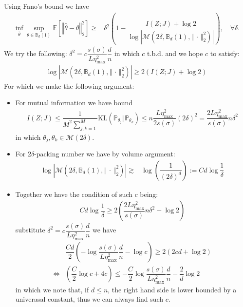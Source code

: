 \documentclass[11pt,a4paper]{ctexart}
\numberwithin{equation}{section}%
\begin{document}
Using Fano's bound we have
\begin{align*}
    \mathop{ \inf }\limits_{\hat{\theta }}\mathop{ \sup }\limits_{\theta \in \mathbb{B}_d(1)} \mathbb{E}\left[ \left\Vert \hat{\theta }-\theta  \right\Vert _2^2 \right] \geq & \delta ^2\left(1-\dfrac{ I(Z;J)+\log 2 }{ \log \left\vert \mathcal{M}(2\delta ,\mathbb{B}_d(1), \left\Vert \, \cdot \,  \right\Vert _2^2 ) \right\vert  }  \right),\quad \forall \delta .
\end{align*}
We try the following: $ \delta ^2 = c\dfrac{ s(\sigma ) }{ L\eta_{\max}^2 }\dfrac{ d }{ n }   $ in which $ c $ t.b.d. and we hope $ c $ to satisfy:
\begin{align*}
    \log \left\vert \mathcal{M}(2\delta ,\mathbb{B}_d(1), \left\Vert \, \cdot \,  \right\Vert _2^2 ) \right\vert \geq 2( I(Z;J)+\log 2)
\end{align*}
For which we make the following argument:
\begin{itemize}[topsep=2pt,itemsep=0pt]
    \item For mutual information we have bound
    \begin{align*}
        I(Z;J)\leq \dfrac{ 1 }{ M^2\sum_{j,k=1}^M }\mathrm{ KL }(\mathbb{P}_{\theta _j}\Vert \mathbb{P}_{\theta _k})\leq n\dfrac{ L\eta^2_{\max} }{ 2s(\sigma ) }(2\delta )^2 = \dfrac{ 2L\eta_{\max}^2 }{ s(\sigma ) }n\delta ^2 
    \end{align*}
    in which $ \theta _j,\theta _k\in \mathcal{M}(2\delta ) $.
    
    \item For 2$ \delta  $-packing number we have by volume argument:
    \begin{align*}
        \log \left\vert \mathcal{M}(2\delta ,\mathbb{B}_d(1), \left\Vert \, \cdot \,  \right\Vert _2^2 ) \right\vert \gtrsim & \log \left( \dfrac{ 1 }{ (2\delta )^d } \right) := Cd\log \dfrac{ 1 }{ \delta  } 
    \end{align*}
    
    \item Together we have the condition of such $ c $ being:
    \begin{align*}
        Cd\log \dfrac{ 1 }{ \delta  }\geq 2\left( \dfrac{ 2L\eta_{\max}^2 }{ s(\sigma ) }n\delta ^2  + \log 2\right) 
    \end{align*}
    substitute $ \delta ^2 = c\dfrac{ s(\sigma ) }{ L\eta_{\max}^2 }\dfrac{ d }{ n }   $ we have
    \begin{align*}
        &\dfrac{ Cd }{ 2 }\left( -\log \dfrac{ s(\sigma ) }{ L\eta_{\max}^2 }\dfrac{ d }{ n }  - \log c  \right)  \geq 2(2cd + \log 2)\\
        \Leftrightarrow& (\dfrac{ C }{ 2 }\log c +4c ) \leq -\dfrac{ C }{ 2 }\log \dfrac{ s(\sigma ) }{ L\eta_{\max}^2 }\dfrac{ d }{ n }  -\dfrac{ 2 }{ d } \log 2
    \end{align*}
    in which we note that, if $ d\leq n $, the right hand side is lower bounded by a univerasal constant, thus we can always find such $ c $.
\end{itemize}
\end{document}
